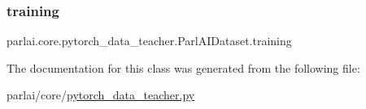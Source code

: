 \subsubsection{\texorpdfstring{training}{training}}
{\footnotesize\ttfamily parlai.\+core.\+pytorch\+\_\+data\+\_\+teacher.\+Parl\+A\+I\+Dataset.\+training}



The documentation for this class was generated from the following file\+:\begin{DoxyCompactItemize}
\item 
parlai/core/\hyperlink{pytorch__data__teacher_8py}{pytorch\+\_\+data\+\_\+teacher.\+py}\end{DoxyCompactItemize}
